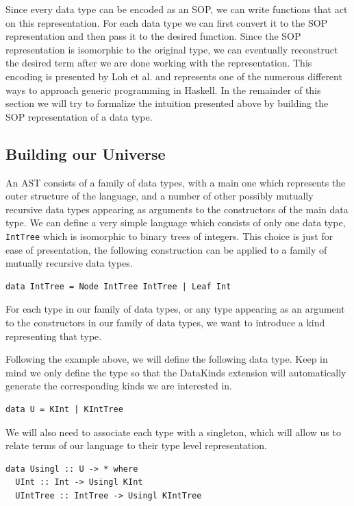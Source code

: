 \documentclass[11pt, titlepage]{article}
\begin{document}
Since every data type can be encoded as an SOP, we can write functions that act on this representation. For each data type we can first convert it to the SOP representation and then pass it to the desired function. Since the SOP representation is isomorphic to the original type, we can eventually reconstruct the desired term after we are done working with the representation. This encoding is presented by Loh et al. \cite{true-sop} and represents one of the numerous different ways to approach generic programming in Haskell. 
In the remainder of this section we will try to formalize the intuition presented above by building the SOP representation of a data type. 

\subsection{Building our Universe}\label{universe}

An AST consists of a family of data types, with a main one which
represents the outer structure of the language, and a number of other
possibly mutually recursive data types appearing as arguments to the
constructors of the main data type. We can define a very simple language which 
consists of only one data type, \texttt{IntTree} which is isomorphic to binary trees 
of integers. This choice is just for ease of presentation, the following construction 
can be applied to a family of mutually recursive data types.

\begin{verbatim}
data IntTree = Node IntTree IntTree | Leaf Int
\end{verbatim}

For each type in our family of data types, or any type appearing as an argument to the constructors in our family of data types, we want to introduce a kind representing that type. 

Following the example above, we will define the following data type. Keep in mind we only define the type so that the DataKinds extension will automatically generate the corresponding kinds we are interested in.

\begin{verbatim}
data U = KInt | KIntTree 
\end{verbatim}

We will also need to associate each type with a singleton, which will allow us to relate terms of our language to their type level representation. 

\begin{verbatim}
data Usingl :: U -> * where
  UInt :: Int -> Usingl KInt
  UIntTree :: IntTree -> Usingl KIntTree
\end{verbatim}
\end{document}
